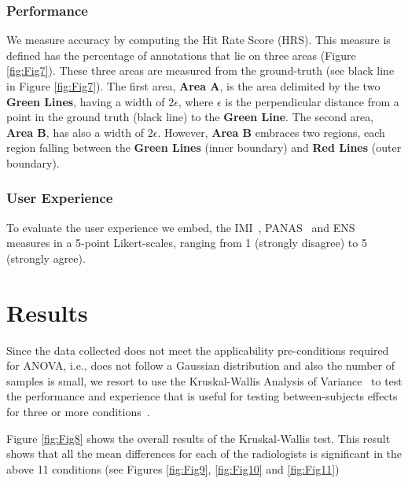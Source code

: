 \documentclass[sigchi-a, authorversion]{acmart}
\begin{document}
\subsubsection{Performance}

We measure accuracy by computing the Hit Rate Score (HRS). This measure is defined has the percentage of annotations that lie on three areas (Figure \ref{fig:Fig7}). These three areas are measured from the ground-truth (see black line in Figure \ref{fig:Fig7}). The first area, \textbf{Area A}, is the area delimited by the two \textbf{Green Lines}, having a width of $2\epsilon$, where $\epsilon$ is the perpendicular distance from a point in the ground truth (black line) to the \textbf{Green Line}\footnotemark. The second area, \textbf{Area B}, has also a width of $2\epsilon$. However,  \textbf{Area B} embraces two regions, each region falling between the \textbf{Green Lines} (inner boundary) and \textbf{Red Lines} (outer boundary).


\subsubsection{User Experience}

To evaluate the user experience we embed, the IMI~\cite{ryan1982control}, PANAS~\cite{watson1999panas}
and ENS~\cite{broeck2010capturing} measures in a 5-point Likert-scales,  ranging from 1 (strongly disagree) to 5 (strongly agree).

\section{Results}

Since the data collected does not meet the applicability pre-conditions required for ANOVA, i.e., does not follow a Gaussian distribution and also the number of samples is small, we resort to use the Kruskal-Wallis Analysis of Variance~\cite{theodorsson1986kruskal} to test the performance and experience that is useful for testing between-subjects effects for three or more conditions~\cite{mcfarlane2002comparison}.

Figure \ref{fig:Fig8}  shows the overall results of the Kruskal-Wallis test. This result shows that all the mean differences for each of the radiologists is significant in the above 11 conditions (see Figures \ref{fig:Fig9}, \ref{fig:Fig10} and \ref{fig:Fig11})
\end{document}
